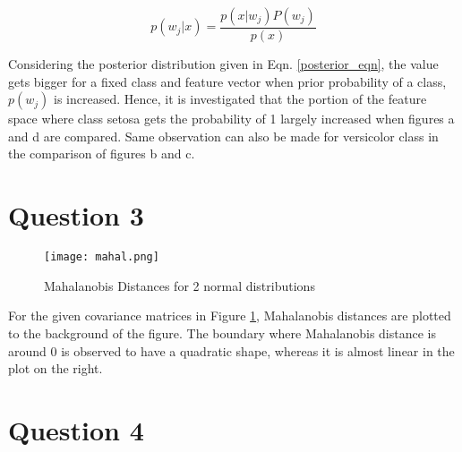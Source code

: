 \documentclass[11pt]{extarticle}
\begin{document}
\begin{equation}
    p(w_j|x) = \frac{p(x|w_j)P(w_j)}{p(x)}
    \label{posterior_eqn}
\end{equation}

Considering the posterior distribution given in Eqn. \ref{posterior_eqn}, the value gets bigger for a fixed class and feature vector
when prior probability of a class, $p(w_j)$ is increased. Hence, it is investigated that the portion of the feature space where class
setosa gets the probability of 1 largely increased when figures a and d are compared. Same observation can also be made for 
versicolor class in the comparison of figures b and c.

\pagebreak 

\section*{Question 3}

{\centering
    \begin{figure}[h]
        \texttt{[image: mahal.png]}
        \caption{Mahalanobis Distances for 2 normal distributions}
        \label{fig:q3figure}
    \end{figure}
}

For the given covariance matrices in Figure \ref{fig:q3figure}, Mahalanobis distances are plotted to the
background of the figure. The boundary where Mahalanobis distance is around 0 is observed to have a 
quadratic shape, whereas it is almost linear in the plot on the right. 

\section*{Question 4}
\end{document}
